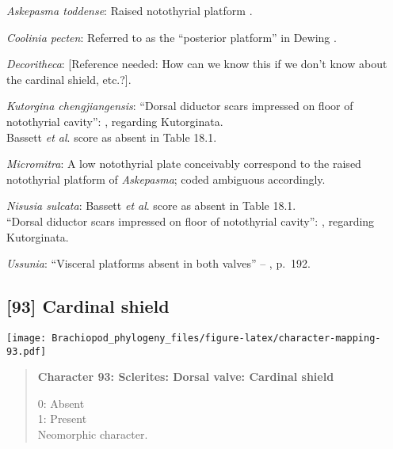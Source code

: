 \documentclass[openany]{book}
\theoremstyle{definition}
\theoremstyle{definition}
\theoremstyle{definition}
\theoremstyle{remark}
\begin{document}
\hypertarget{Askepasma_toddense-coding-92}{}
\emph{Askepasma toddense}: Raised notothyrial platform
\citep{Williams1998Thediversity}.

\hypertarget{Coolinia_pecten-coding-92}{}
\emph{Coolinia pecten}: Referred to as the ``posterior platform'' in
Dewing \citeyearpar{Dewing2001Hingemodifications}.

\hypertarget{Decoritheca-coding-92}{}
\emph{Decoritheca}: {[}Reference needed: How can we know this if we
don't know about the cardinal shield, etc.?{]}.

\hypertarget{Kutorgina_chengjiangensis-coding-92}{}
\emph{Kutorgina chengjiangensis}: ``Dorsal diductor scars impressed on
floor of notothyrial cavity'':
\citet{Williams2000LinguliformeaCraniiformea}, regarding Kutorginata.\\
Bassett \emph{et al}. \citeyearpar{Bassett2001Functionalmorphology}
score as absent in Table 18.1.

\hypertarget{Micromitra-coding-92}{}
\emph{Micromitra}: A low notothyrial plate
\citep{Williams1998Thediversity} conceivably correspond to the raised
notothyrial platform of \emph{Askepasma}; coded ambiguous accordingly.

\hypertarget{Nisusia_sulcata-coding-92}{}
\emph{Nisusia sulcata}: Bassett \emph{et al}.
\citeyearpar{Bassett2001Functionalmorphology} score as absent in Table
18.1.\\
``Dorsal diductor scars impressed on floor of notothyrial cavity'':
\citet{Williams2000LinguliformeaCraniiformea}, regarding Kutorginata.

\hypertarget{Ussunia-coding-92}{}
\emph{Ussunia}: ``Visceral platforms absent in both valves'' --
\citet{Williams2000LinguliformeaCraniiformea}, p.~192.

\subsection*{{[}93{]} Cardinal shield}\label{cardinal-shield}

\texttt{[image: Brachiopod\_phylogeny\_files/figure-latex/character-mapping-93.pdf]}

\begin{quote}
\textbf{Character 93: Sclerites: Dorsal valve: Cardinal shield}

0: Absent\\
1: Present\\
Neomorphic character.
\end{quote}
\end{document}
